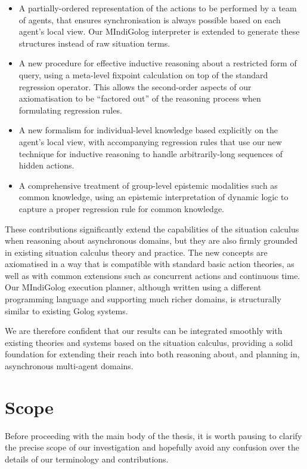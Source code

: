 \begin{itemize}
\item A partially-ordered representation of the actions to be performed
by a team of agents, that ensures synchronisation is always possible
based on each agent's local view. Our MIndiGolog interpreter is extended
to generate these structures instead of raw situation terms. 
\item A new procedure for effective inductive reasoning about a restricted
form of query, using a meta-level fixpoint calculation on top of the
standard regression operator. This allows the second-order aspects
of our axiomatisation to be {}``factored out'' of the reasoning
process when formulating regression rules. 
\item A new formalism for individual-level knowledge based explicitly on
the agent's local view, with accompanying regression rules that use
our new technique for inductive reasoning to handle arbitrarily-long
sequences of hidden actions. 
\item A comprehensive treatment of group-level epistemic modalities such
as common knowledge, using an epistemic interpretation of dynamic
logic to capture a proper regression rule for common knowledge. 
\end{itemize}
These contributions significantly extend the capabilities of the situation
calculus when reasoning about asynchronous domains, but they are also
firmly grounded in existing situation calculus theory and practice.
The new concepts are axiomatised in a way that is compatible with
standard basic action theories, as well as with common extensions
such as concurrent actions and continuous time. Our MIndiGolog execution
planner, although written using a different programming language and
supporting much richer domains, is structurally similar to existing
Golog systems.

We are therefore confident that our results can be integrated smoothly
with existing theories and systems based on the situation calculus,
providing a solid foundation for extending their reach into both reasoning
about, and planning in, asynchronous multi-agent domains. 


\section{Scope}

Before proceeding with the main body of the thesis, it is worth pausing
to clarify the precise scope of our investigation and hopefully avoid
any confusion over the details of our terminology and contributions.


